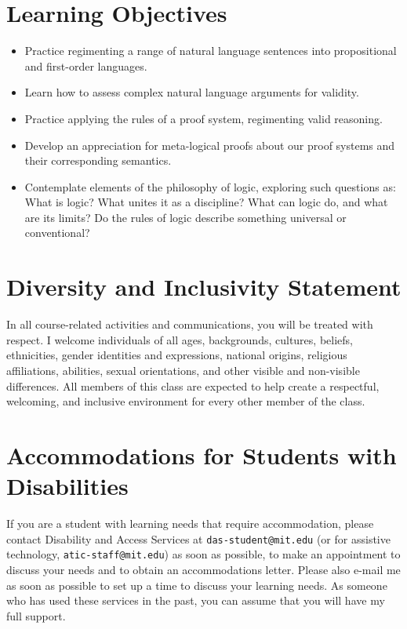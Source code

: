 \documentclass[letterpaper]{infinity_syllabus} %
\begin{document}
\section{Learning Objectives}

\begin{itemize}
  \item Practice regimenting a range of natural language sentences into propositional and first-order languages.
  \item Learn how to assess complex natural language arguments for validity.
  \item Practice applying the rules of a proof system, regimenting valid reasoning.
  \item Develop an appreciation for meta-logical proofs about our proof systems and their corresponding semantics.
  \item Contemplate elements of the philosophy of logic, exploring such questions as: What is logic? What unites it as a discipline? What can logic do, and what are its limits? Do the rules of logic describe something universal or conventional?
\end{itemize}

\vspace{0.5cm}
\section{Diversity and Inclusivity Statement}

In all course-related activities and communications, you will be treated with respect.
I welcome individuals of all ages, backgrounds, cultures, beliefs, ethnicities, gender identities and expressions, national origins, religious affiliations, abilities, sexual orientations, and other visible and non-visible differences.
All members of this class are expected to help create a respectful, welcoming, and inclusive environment for every other member of the class.

\vspace{0.5cm}
\section{Accommodations for Students with Disabilities}

If you are a student with learning needs that require accommodation, please contact Disability and Access Services at \texttt{das-student@mit.edu} (or for assistive technology, \texttt{atic-staff@mit.edu}) as soon as possible, to make an appointment to discuss your needs and to obtain an accommodations letter.
Please also e-mail me as soon as possible to set up a time to discuss your learning needs.
As someone who has used these services in the past, you can assume that you will have my full support.
\end{document}
